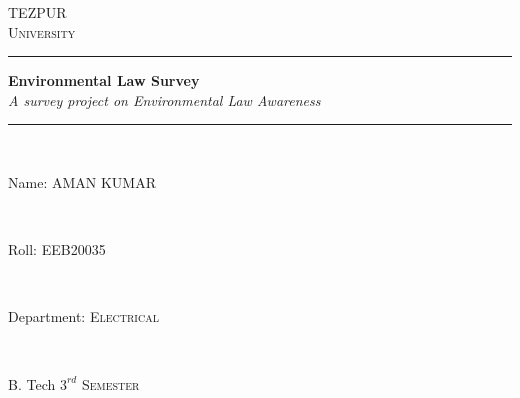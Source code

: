 \newcommand{\reporttitle}[2]{
\center
\rule[0.2cm]{13cm}{0.1cm}
{ \huge \bfseries #1}\\[0.4cm] %
{\Large \slshape #2}\\[0.4cm]
\rule[0.2cm]{13cm}{0.1cm}\\[3cm]
}

\newcommand{\UNI}{
\textsc{\Huge TEZPUR \\[0.3cm] University}\\[0.7cm]
}

\newcommand{\info}[2]{
\begin{minipage}{0.4\textwidth}
\normalsize
\centering
#1 \textsc{#2}\\
\end{minipage}\\
}

\begin{titlepage}

\center 
\UNI

\reporttitle{Environmental Law Survey}{A survey project on Environmental Law Awareness}

\info{Name: } {AMAN KUMAR}
\info{Roll: } {EEB20035}
\info{Department: } {Electrical}
\info{B. Tech} {\(3^{rd}\) Semester}
\vfill

\end{titlepage}